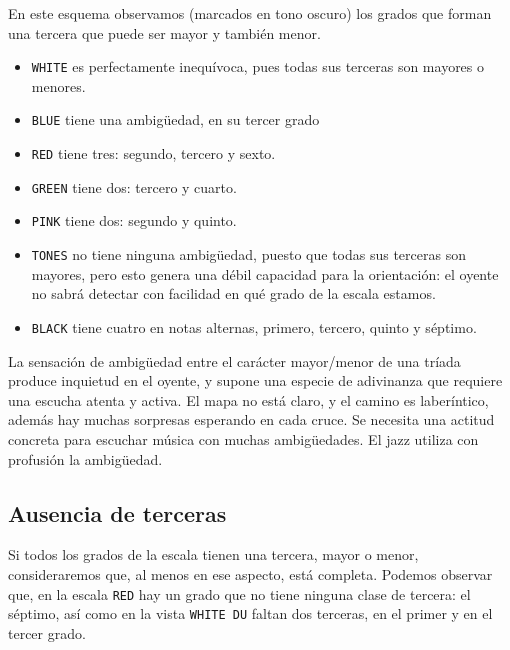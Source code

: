 \documentclass[]{report}
\providecommand{\tightlist}{%
  \setlength{\itemsep}{0pt}
  \setlength{\parskip}{0pt}
}
\begin{document}
En este esquema observamos (marcados en tono oscuro) los grados que forman una tercera que puede ser mayor y también menor.

\begin{itemize}   \tightlist
	\item  \texttt{WHITE} es perfectamente inequívoca, pues todas sus terceras         son mayores o menores.
	\item  \texttt{BLUE} tiene una ambigüedad, en su tercer grado
	\item  \texttt{RED} tiene tres: segundo, tercero y sexto.
	\item  \texttt{GREEN} tiene dos: tercero y cuarto.
	\item  \texttt{PINK} tiene dos: segundo y quinto.
	\item  \texttt{TONES} no tiene ninguna ambigüedad, puesto que todas sus         terceras son mayores, pero esto genera una débil capacidad para la         orientación: el oyente no sabrá detectar con facilidad en qué grado de         la escala estamos.
	\item  \texttt{BLACK} tiene cuatro en notas alternas, primero, tercero,         quinto y séptimo.
\end{itemize}

La sensación de ambigüedad entre el carácter mayor/menor de una tríada produce inquietud en el oyente, y supone una especie de adivinanza que requiere una escucha atenta y activa. El mapa no está claro, y el camino es laberíntico, además hay muchas sorpresas esperando en cada cruce. Se necesita una actitud concreta para escuchar música con muchas ambigüedades. El jazz utiliza con profusión la ambigüedad.

\subsection{Ausencia de terceras}

Si todos los grados de la escala tienen una tercera, mayor o menor, consideraremos que, al menos en ese aspecto, está completa. Podemos observar que, en la escala \texttt{RED} hay un grado que no tiene ninguna clase de tercera: el séptimo, así como en la vista \texttt{WHITE DU} faltan dos terceras, en el primer y en el tercer grado.
\end{document}
